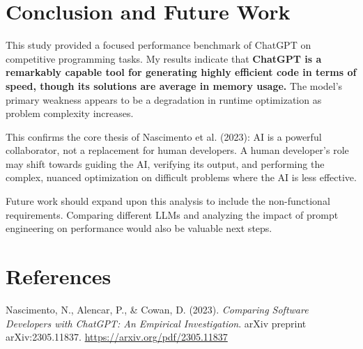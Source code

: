 \documentclass[12pt, a4paper]{article}
\begin{document}
\section{Conclusion and Future Work}

This study provided a focused performance benchmark of ChatGPT on competitive programming tasks. My results indicate that \textbf{ChatGPT is a remarkably capable tool for generating highly efficient code in terms of speed, though its solutions are average in memory usage.} The model's primary weakness appears to be a degradation in runtime optimization as problem complexity increases.

This confirms the core thesis of Nascimento et al. (2023): AI is a powerful collaborator, not a replacement for human developers. A human developer's role may shift towards guiding the AI, verifying its output, and performing the complex, nuanced optimization on difficult problems where the AI is less effective.

Future work should expand upon this analysis to include the non-functional requirements. Comparing different LLMs and analyzing the impact of prompt engineering on performance would also be valuable next steps.

\section{References}

Nascimento, N., Alencar, P., \& Cowan, D. (2023). \textit{Comparing Software Developers with ChatGPT: An Empirical Investigation}. arXiv preprint arXiv:2305.11837. \url{https://arxiv.org/pdf/2305.11837}
\end{document}
